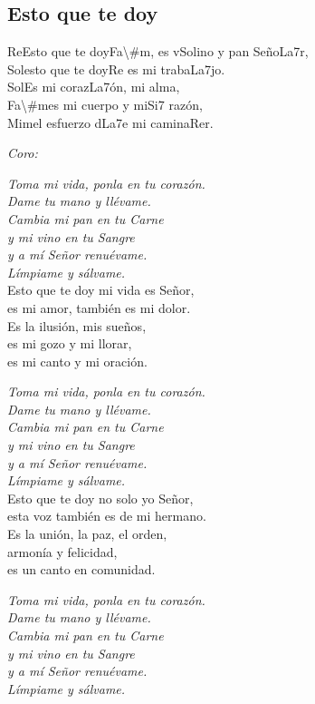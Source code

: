 \subsection{Esto que te doy}
\begin{center}
{\Large
\ac{Re}Esto que te doy\ac{Fa\#m}, es v\ac{Sol}ino y pan Seño\ac{La7}r,\\
\ac{Sol}esto que te doy\ac{Re} es mi traba\ac{La7}jo.\\
\ac{Sol}Es mi coraz\ac{La7}ón, mi alma,\\
\ac{Fa\#m}es mi cuerpo y mi\ac{Si7} razón,\\
\ac{Mim}el esfuerzo d\ac{La7}e mi camina\ac{Re}r.
\begin{flushleft}
\hspace{5em}\textit{Coro:}
\end{flushleft}
\textit{Toma mi vida, ponla en tu corazón.}\\
\textit{Dame tu mano y llévame.}\\
\textit{Cambia mi pan en tu Carne}\\
\textit{y mi vino en tu Sangre}\\
\textit{y a mí Señor renuévame.}\\
\textit{Límpiame y sálvame.}\\
\vspace{1em}
Esto que te doy mi vida es Señor,\\
es mi amor, también es mi dolor.\\
Es la ilusión, mis sueños,\\
es mi gozo y mi llorar,\\
es mi canto y mi oración.\pagebreak

\textit{Toma mi vida, ponla en tu corazón.}\\
\textit{Dame tu mano y llévame.}\\
\textit{Cambia mi pan en tu Carne}\\
\textit{y mi vino en tu Sangre}\\
\textit{y a mí Señor renuévame.}\\
\textit{Límpiame y sálvame.}\\
\vspace{1em}
Esto que te doy no solo yo Señor,\\
esta voz también es de mi hermano.\\
Es la unión, la paz, el orden,\\
armonía y felicidad,\\
es un canto en comunidad.\\
\vspace{1em}

\textit{Toma mi vida, ponla en tu corazón.}\\
\textit{Dame tu mano y llévame.}\\
\textit{Cambia mi pan en tu Carne}\\
\textit{y mi vino en tu Sangre}\\
\textit{y a mí Señor renuévame.}\\
\textit{Límpiame y sálvame.}\\
\vspace{1em}}
\end{center}
